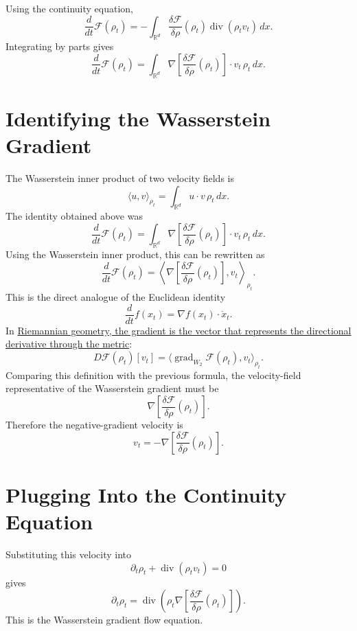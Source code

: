 \documentclass[11pt]{article}
\begin{document}
Using the continuity equation,
\[
\frac{d}{dt}\mathcal F(\rho_t)
=
-\int_{\mathbb R^d}
\frac{\delta\mathcal F}{\delta\rho}(\rho_t)
\operatorname{div}(\rho_t v_t)\,dx.
\]
Integrating by parts gives
\[
\frac{d}{dt}\mathcal F(\rho_t)
=
\int_{\mathbb R^d}
\nabla
\left[
\frac{\delta\mathcal F}{\delta\rho}(\rho_t)
\right]
\cdot v_t\,\rho_t\,dx.
\]

\section*{Identifying the Wasserstein Gradient}

The Wasserstein inner product of two velocity fields is
\[
\langle u,v\rangle_{\rho_t}
=
\int_{\mathbb R^d}u\cdot v\,\rho_t\,dx.
\]
The identity obtained above was
\[
\frac{d}{dt}\mathcal F(\rho_t)
=
\int_{\mathbb R^d}
\nabla
\left[
\frac{\delta\mathcal F}{\delta\rho}(\rho_t)
\right]
\cdot v_t\,\rho_t\,dx.
\]
Using the Wasserstein inner product, this can be rewritten as
\[
\frac{d}{dt}\mathcal F(\rho_t)
=
\left\langle
\nabla
\left[
\frac{\delta\mathcal F}{\delta\rho}(\rho_t)
\right],
v_t
\right\rangle_{\rho_t}.
\]
This is the direct analogue of the Euclidean identity
\[
\frac{d}{dt}f(x_t)
=
\nabla f(x_t)\cdot \dot x_t.
\]
In \href{riemannian_gradient_descent.html}{Riemannian geometry, the gradient is the vector that represents the
directional derivative through the metric}:
\[
D\mathcal F(\rho_t)[v_t]
=
\langle \operatorname{grad}_{W_2}\mathcal F(\rho_t),v_t\rangle_{\rho_t}.
\]
Comparing this definition with the previous formula, the velocity-field
representative of the Wasserstein gradient must be
\[
\nabla
\left[
\frac{\delta\mathcal F}{\delta\rho}(\rho_t)
\right].
\]
Therefore the negative-gradient velocity is
\[
v_t
=
-
\nabla
\left[
\frac{\delta\mathcal F}{\delta\rho}(\rho_t)
\right].
\]

\section*{Plugging Into the Continuity Equation}

Substituting this velocity into
\[
\partial_t\rho_t+\operatorname{div}(\rho_t v_t)=0
\]
gives
\[
\partial_t\rho_t
=
\operatorname{div}
\left(
\rho_t
\nabla
\left[
\frac{\delta\mathcal F}{\delta\rho}(\rho_t)
\right]
\right).
\]
This is the Wasserstein gradient flow equation.
\end{document}
